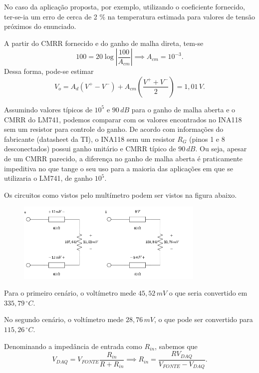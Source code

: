 \documentclass[a4paper]{report}
\begin{document}
No caso da aplicação proposta, por exemplo, utilizando o coeficiente fornecido, ter-se-ia um erro de cerca de 2 \% na temperatura estimada para valores de tensão próximos do enunciado.


A partir do CMRR fornecido e do ganho de malha direta, tem-se \[
    100 = 20 \log \left|\frac{100}{A_{cm}}\right| \implies A_{cm} = 10^{-3}
.\] Dessa forma, pode-se estimar \[
V_o = A_d\left( V^{+}-V^{-} \right) + A_{cm}\left( \frac{V^{+}+V^{-}}{2} \right) = 1,01\,V
.\] 


Assumindo valores típicos de $10^5$ e $90\,dB$ para o ganho de malha aberta e o CMRR do LM741, podemos comparar com os valores encontrados no INA118 sem um resistor para controle do ganho. De acordo com informações do fabricante (datasheet da TI), o INA118 sem um resistor $R_G$ (pinos 1 e 8 desconectados) possui ganho unitário e CMRR típico de $90\,dB$. Ou seja, apesar de um CMRR parecido, a diferença no ganho de malha aberta é praticamente impeditiva no que tange o seu uso para a maioria das aplicações em que se utilizaria o LM741, de ganho $10^5$.


Os circuitos como vistos pelo multímetro podem ser vistos na figura abaixo.

\begin{figure}[H]
    \centering
    \includegraphics[width=0.8\textwidth]{lista2_5.png}
\end{figure}


Para o primeiro cenário, o voltímetro mede $45,52\,mV$ o que seria convertido em $335,79\,^\circ C$.


No segundo cenário, o voltímetro mede $28,76\,mV$, o que pode ser convertido para $115,26\,^\circ C$.


Denominando a impedância de entrada como $R_{in}$, sabemos que \[
V_{DAQ} = V_{FONTE} \frac{R_{in}}{R +R_{in}} \implies R_{in} = \frac{R V_{DAQ}}{V_{FONTE} - V_{DAQ}}
.\] 
\end{document}
